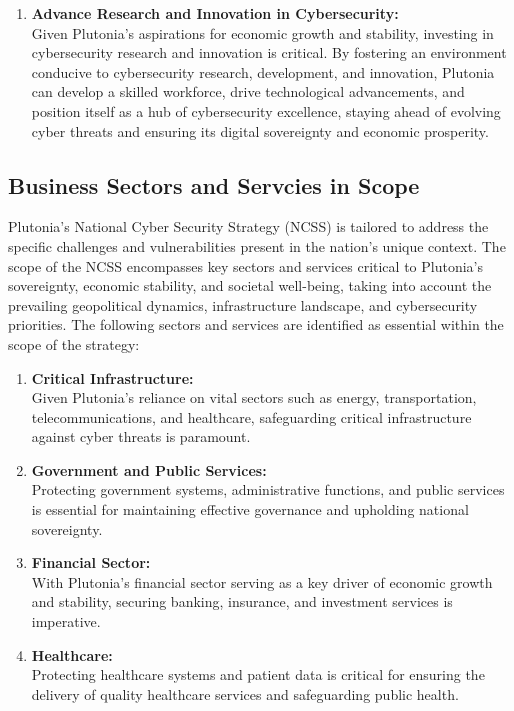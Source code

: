 \documentclass[
	a4paper, %
	10pt, %
]{CSSullivanBusinessReport}
\begin{document}
\begin{fullwidth}
\begin{justify}
\begin{enumerate}
	\item \textbf{Advance Research and Innovation in Cybersecurity:} \\Given Plutonia's aspirations for economic growth and stability, investing in cybersecurity research and innovation is critical. By fostering an environment conducive to cybersecurity research, development, and innovation, Plutonia can develop a skilled workforce, drive technological advancements, and position itself as a hub of cybersecurity excellence, staying ahead of evolving cyber threats and ensuring its digital sovereignty and economic prosperity.
\end{enumerate}

\subsection{Business Sectors and Servcies in Scope}
Plutonia's National Cyber Security Strategy (NCSS) is tailored to address the specific challenges and vulnerabilities present in the nation's unique context. The scope of the NCSS encompasses key sectors and services critical to Plutonia's sovereignty, economic stability, and societal well-being, taking into account the prevailing geopolitical dynamics, infrastructure landscape, and cybersecurity priorities. The following sectors and services are identified as essential within the scope of the strategy:
\begin{enumerate}
	\item \textbf{Critical Infrastructure:} \\Given Plutonia's reliance on vital sectors such as energy, transportation, telecommunications, and healthcare, safeguarding critical infrastructure against cyber threats is paramount.
	\item \textbf{Government and Public Services:} \\Protecting government systems, administrative functions, and public services is essential for maintaining effective governance and upholding national sovereignty.
	\item \textbf{Financial Sector:} \\With Plutonia's financial sector serving as a key driver of economic growth and stability, securing banking, insurance, and investment services is imperative.
	\item \textbf{Healthcare:} \\Protecting healthcare systems and patient data is critical for ensuring the delivery of quality healthcare services and safeguarding public health.

\end{enumerate}
\end{justify}
\end{fullwidth}
\end{document}
